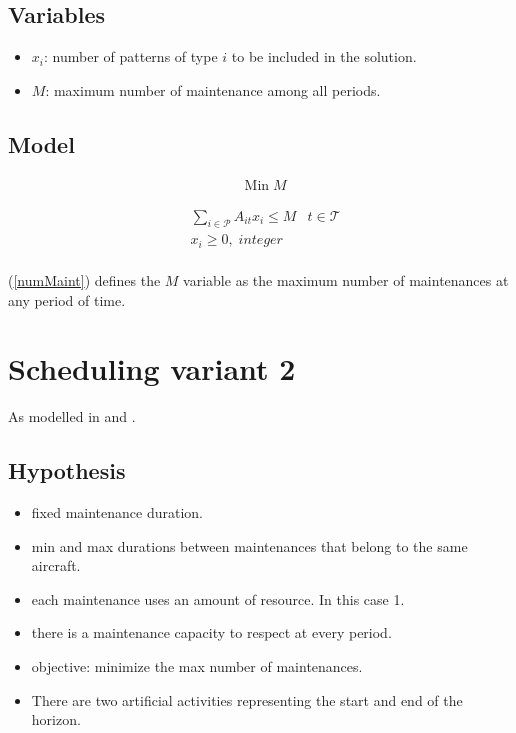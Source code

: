 \documentclass[a4paper,11pt]{article}
\begin{document}
    \subsection{Variables}

    \begin{itemize}
        \item $x_i$: number of patterns of type $i$ to be included in the solution.
        \item $M$: maximum number of maintenance among all periods.
    \end{itemize}

    \subsection{Model}

    \begin{align}
        & \text{Min}\; M
    \end{align}

    \begin{align}
        & \sum_{i \in \mathcal{P}} A_{it}x_{i} \leq M & t \in \mathcal{T} \label{numMaint} \\
        & x_{i} \geq 0,\; integer \\
    \end{align}

        (\ref{numMaint}) defines the $M$ variable as the maximum number of maintenances at any period of time.


\clearpage

\section{Scheduling variant 2}

    As modelled in \cite{Rieck2012} and \cite{Neumann2000}.

    \subsection{Hypothesis}

    \begin{itemize}
     \item fixed maintenance duration.
     \item min and max durations between maintenances that belong to the same aircraft.
     \item each maintenance uses an amount of resource. In this case 1.
     \item there is a maintenance capacity to respect at every period.
     \item objective: minimize the max number of maintenances.
     \item There are two artificial activities representing the start and end of the horizon.
    \end{itemize}
\end{document}
